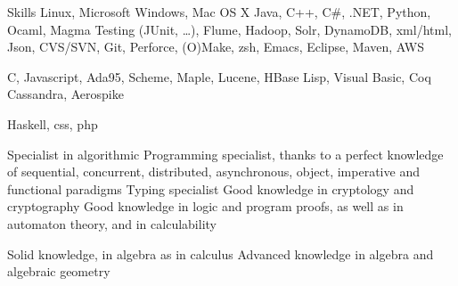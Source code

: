 \begin{rubric}{\color{ForestGreen} Skills}
  \entry*[Expert]
  Linux, Microsoft Windows, Mac OS X
  \entry*
  Java, C++,  C$\#$, .NET, Python, Ocaml,  Magma
  \entry* Testing (JUnit, \ldots), Flume, Hadoop, Solr, DynamoDB, xml/html, Json, \LaTeXe
  \entry*
  CVS/SVN, Git, Perforce, (O)Make, zsh, Emacs, Eclipse, Maven, AWS

  \entry*[Mastered]
  C, Javascript, Ada95, Scheme, Maple, Lucene, HBase
  \entry*
  Lisp, Visual Basic, Coq
  \entry* Cassandra, Aerospike

  \entry*[Notions]
  Haskell, css, php

  \entry*
  Specialist in algorithmic %
  \entry*
  Programming specialist, thanks to a perfect knowledge of sequential,
  concurrent, distributed, asynchronous, object, imperative
  and functional paradigms
  \entry*
  Typing specialist
  \entry*
  Good knowledge in cryptology and cryptography
  \entry*
  Good knowledge in logic and program proofs, as well as in automaton theory, and in calculability

  \entry* Solid knowledge, in algebra as in calculus
  \entry* Advanced knowledge in algebra and algebraic geometry
\end{rubric}
